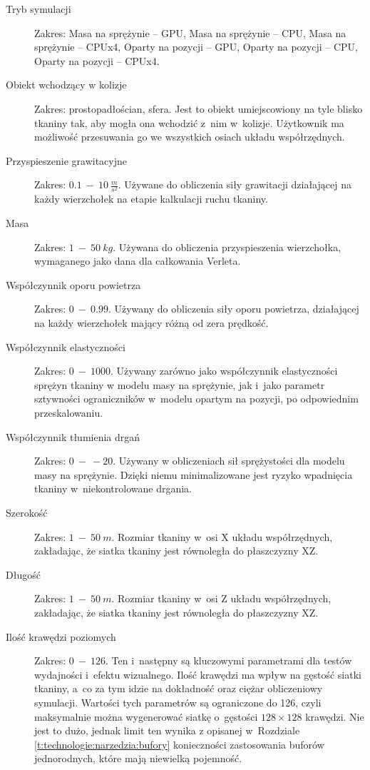 		\begin{description}
			
			\item[Tryb symulacji] Zakres: Masa na sprężynie -- GPU, Masa na sprężynie -- CPU, Masa na sprężynie -- CPUx4, Oparty na pozycji -- GPU, Oparty na pozycji -- CPU, Oparty na pozycji -- CPUx4.
			
			\item[Obiekt wchodzący w kolizje] Zakres: prostopadłościan, sfera. Jest to obiekt umiejscowiony na tyle blisko tkaniny tak, aby mogła ona wchodzić z~nim w~kolizje. Użytkownik ma możliwość przesuwania go we wszystkich osiach układu współrzędnych.
			
			\item[Przyspieszenie grawitacyjne] Zakres: \(0.1\ -\ 10\ \frac{m}{s^{2}} \). Używane do obliczenia siły grawitacji działającej na każdy wierzchołek na etapie kalkulacji ruchu tkaniny.
			
			\item[Masa] Zakres: \(1\ -\ 50\ kg\). Używana do obliczenia przyspieszenia wierzchołka, wymaganego jako dana dla całkowania Verleta.
			
			\item[Współczynnik oporu powietrza] Zakres: \(0\ -\ 0.99\). Używany do obliczenia siły oporu powietrza, działającej na każdy wierzchołek mający różną od zera prędkość.
			
			\item[Współczynnik elastyczności] Zakres: \(0\ -\ 1000\). Używany zarówno jako współczynnik elastyczności sprężyn tkaniny w modelu masy na sprężynie, jak i~jako parametr sztywności ograniczników w~modelu opartym na pozycji, po odpowiednim przeskalowaniu.
			
			\item[Współczynnik tłumienia drgań] Zakres: \(0\ -\ -20\). Używany w obliczeniach sił sprężystości dla modelu masy na sprężynie. Dzięki niemu minimalizowane jest ryzyko wpadnięcia tkaniny w~niekontrolowane drgania.
			
			\item[Szerokość] Zakres: \(1\ -\ 50\ m\). Rozmiar tkaniny w~osi X układu współrzędnych, zakładając, że siatka tkaniny jest równoległa do płaszczyzny XZ.
			
			\item[Długość]Zakres: \(1\ -\ 50\ m\). Rozmiar tkaniny w~osi Z układu współrzędnych, zakładając, że siatka tkaniny jest równoległa do płaszczyzny XZ.
			
			\item[Ilość krawędzi poziomych] Zakres: \(0\ -\ 126\). Ten i~następny są kluczowymi parametrami dla testów wydajności i~efektu wizualnego. Ilość krawędzi ma wpływ na gęstość siatki tkaniny, a~co za tym idzie na dokładność oraz ciężar obliczeniowy symulacji. Wartości tych parametrów są ograniczone do 126, czyli maksymalnie można wygenerować siatkę o~gęstości \( 128 \times 128 \) krawędzi. Nie jest to dużo, jednak limit ten wynika z opisanej w~Rozdziale \ref{t:technologie:narzedzia:bufory} konieczności zastosowania buforów jednorodnych, które mają niewielką pojemność.
			

\end{description}
